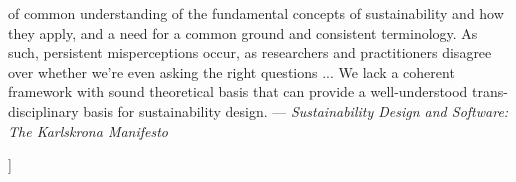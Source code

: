 \documentclass[11pt,twocolumn]{article}
\begin{document}
\begin{@twocolumnfalse}
\begin{lrbox}{\qboxi}
\begin{frquote}
of  common  understanding  of  the  fundamental  concepts  of
sustainability and how they apply, and a need for a common
ground and consistent terminology. As such, persistent 
misperceptions occur, as researchers and practitioners disagree over
whether we're even asking the right questions ...
We  lack  a  coherent  framework  with  sound  theoretical  basis
that can provide a well-understood trans-disciplinary basis for
sustainability design. --- 
\textit{{\sadded}Sustainability Design and Software: {\eadded} 
The Karlskrona Manifesto} {\cite[page 5]{Karlskrona}}
\end{frquote}
\end{lrbox}	
\vspace{1em}
\begin{flushright}
\usebox{\qboxi}
\end{flushright}
\vspace{1em}
\decoline{}
\vspace{4em}
\end{@twocolumnfalse}]











\end{document}
